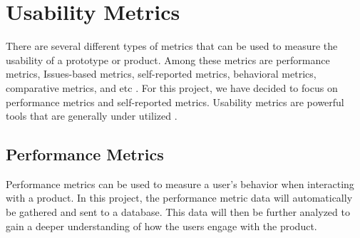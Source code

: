 \section{Usability Metrics}
There are several different types of metrics that can be used to measure the usability of a prototype or product. Among these metrics are performance metrics, Issues-based metrics, self-reported metrics, behavioral metrics, comparative metrics, and etc \cite{tullis_albert_2011}. For this project, we have decided to focus on performance metrics and self-reported metrics. Usability metrics are powerful tools that are generally under utilized \cite{norman_metrics}. 

\subsection{Performance Metrics}
Performance metrics can be used to measure a user's behavior when interacting with a product. In this project, the performance metric data will automatically be gathered and sent to a database. This data will then be further analyzed to gain a deeper understanding of how the users engage with the product. 

